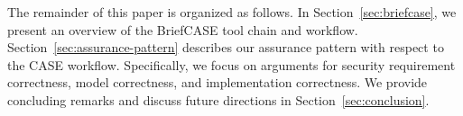 The remainder of this paper is organized as follows. In Section~\ref{sec:briefcase}, we present an overview of the BriefCASE tool chain and workflow. Section~\ref{sec:assurance-pattern} describes our assurance pattern with respect to the CASE workflow. Specifically, we focus on arguments for security requirement correctness, model correctness, and implementation correctness.  We provide concluding remarks and discuss future directions in Section~\ref{sec:conclusion}.